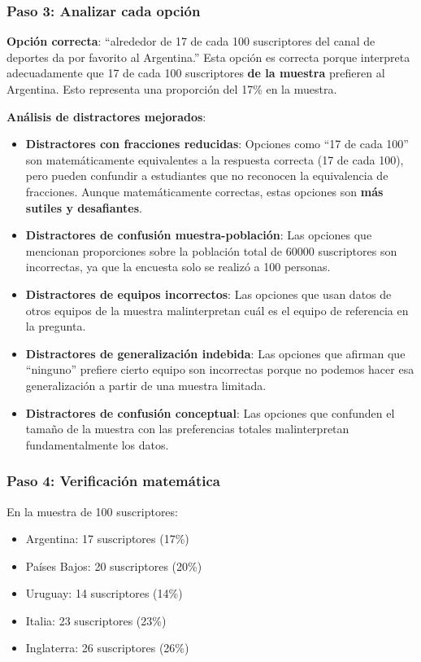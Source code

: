 \documentclass[
]{article}
\providecommand{\tightlist}{%
  \setlength{\itemsep}{0pt}\setlength{\parskip}{0pt}}
\begin{document}
\subsubsection{Paso 3: Analizar cada
opción}\label{paso-3-analizar-cada-opciuxf3n}

\textbf{Opción correcta}: ``alrededor de 17 de cada 100 suscriptores del
canal de deportes da por favorito al Argentina.'' Esta opción es
correcta porque interpreta adecuadamente que 17 de cada 100 suscriptores
\textbf{de la muestra} prefieren al Argentina. Esto representa una
proporción del 17\% en la muestra.

\textbf{Análisis de distractores mejorados}:

\begin{itemize}
\item
  \textbf{Distractores con fracciones reducidas}: Opciones como ``17 de
  cada 100'' son matemáticamente equivalentes a la respuesta correcta
  (17 de cada 100), pero pueden confundir a estudiantes que no reconocen
  la equivalencia de fracciones. Aunque matemáticamente correctas, estas
  opciones son \textbf{más sutiles y desafiantes}.
\item
  \textbf{Distractores de confusión muestra-población}: Las opciones que
  mencionan proporciones sobre la población total de 60000 suscriptores
  son incorrectas, ya que la encuesta solo se realizó a 100 personas.
\item
  \textbf{Distractores de equipos incorrectos}: Las opciones que usan
  datos de otros equipos de la muestra malinterpretan cuál es el equipo
  de referencia en la pregunta.
\item
  \textbf{Distractores de generalización indebida}: Las opciones que
  afirman que ``ninguno'' prefiere cierto equipo son incorrectas porque
  no podemos hacer esa generalización a partir de una muestra limitada.
\item
  \textbf{Distractores de confusión conceptual}: Las opciones que
  confunden el tamaño de la muestra con las preferencias totales
  malinterpretan fundamentalmente los datos.
\end{itemize}

\subsubsection{Paso 4: Verificación
matemática}\label{paso-4-verificaciuxf3n-matemuxe1tica}

En la muestra de 100 suscriptores:

\begin{itemize}
\tightlist
\item
  Argentina: 17 suscriptores (17\%)
\item
  Países Bajos: 20 suscriptores (20\%)
\item
  Uruguay: 14 suscriptores (14\%)
\item
  Italia: 23 suscriptores (23\%)
\item
  Inglaterra: 26 suscriptores (26\%)
\end{itemize}
\end{document}
